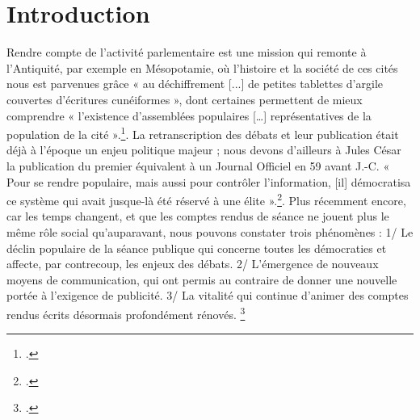 \chapter*{Introduction}
\label{sec:introduction}

Rendre compte de l’activité parlementaire est une mission qui remonte à l’Antiquité, par exemple en Mésopotamie, où l’histoire et la société de ces cités nous est parvenues grâce « au déchiffrement [...] de petites tablettes d’argile couvertes d’écritures cunéiformes », dont certaines permettent de mieux comprendre « l’existence d’assemblées populaires […] représentatives de la population de la cité ».\footcite{HistoireSeance}. La retranscription des débats et leur publication était déjà à l’époque un enjeu politique majeur ; nous devons d’ailleurs à Jules César la publication du premier équivalent à un Journal Oﬀiciel en 59 avant J.-C. « Pour se rendre populaire, mais aussi pour contrôler l’information, [il] démocratisa ce système qui avait jusque-là été réservé à une élite ».\footcite{HistoireSeance}.
Plus récemment encore, car les temps changent, et que les comptes rendus de séance ne jouent plus le même rôle social qu’auparavant, nous pouvons constater trois phénomènes :
1/ Le déclin populaire de la séance publique qui concerne toutes les démocraties et affecte,
par contrecoup, les enjeux des débats.
2/ L’émergence de nouveaux moyens de communication, qui ont permis au contraire de donner une nouvelle portée à l’exigence de publicité.
3/ La vitalité qui continue d’animer des comptes rendus écrits désormais profondément rénovés. \footcite{HistoireSeance}

